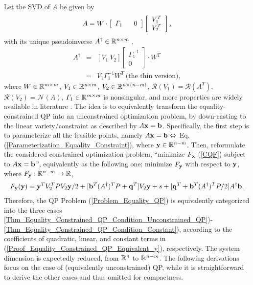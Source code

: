 \documentclass{imaman}
\newcommand{\beq}{\begin{eqnarray}}
\newcommand{\eeq}{\end{eqnarray}}
\newcommand{\bfb}{{\bf b}}
\newcommand{\bfx}{{\bf x}}
\newcommand{\bfq}{{\bf q}}
\newcommand{\bfy}{{\bf y}}
\newcommand{\real}{\mathbb{R}}
\newcommand{\calN}{{\mathcal N}}
\newcommand{\calR}{{\mathcal R}}
\newcommand{\itm}{{\it m}}
\newcommand{\itn}{{\it n}}
\numberwithin{equation}{section}
\begin{document}
Let the SVD of $A$ be given by
\beq
A=W\cdot\left[ \begin{array}{cc} \Gamma_1~~ & 0 \end{array}\right]\left[ \def\arraystretch{1}\begin{array}{c} V_1^T\\V_2^T\end{array}\right],\nonumber
\eeq
with its unique pseudoinverse $A^\dagger\in\real^{\itn\times\itm}$ \citep{GoVa:13},
\newpage\noindent\beq
A^\dagger&=&[V_1~V_2]\left[ \begin{array}{c} \Gamma_1^{-1}\\ 0 \end{array}\right]\cdot W^T\nonumber\\
&=&V_1\Gamma_1^{-1}W^T~\mbox{(the thin version)},
\label{App_Proof_Equality_Constrained_QP_A_dagger}
\eeq
where $W\in\real^{\itm\times\itm}$, $V_1\in\real^{\itn\times\itm}$, $V_2\in\real^{\itn\times(\itn-\itm)}$, $\calR(V_1)=\calR(A^T)$, $\calR(V_2)=\calN(A)$, $\Gamma_1\in\real^{\itm\times\itm}$ is nonsingular, and more properties are widely available in literature \citep{GoVa:13}. The idea is to equivalently transform the equality-constrained QP into an unconstrained optimization problem, by down-casting to the linear variety/constraint as described by $A\bfx=\bfb$. Specifically, the first step is to parameterize all the feasible points, namely $A\bfx=\bfb\Leftrightarrow$ Eq. (\ref{Parameterization_Equality_Constraint}), where $\bfy\in\real^{\itn-\itm}$. Then, reformulate the considered constrained optimization problem, ``minimize $F_\bfx$ (\ref{CQF}) subject to $A\bfx=\bfb$'', equivalently as the following one: minimize $F_\bfy$ with respect to $\bfy$, where $F_\bfy:\real^{\itn-\itm}\rightarrow\real$,
\beq
F_\bfy(\bfy)=\bfy^TV_2^TPV_2\bfy/2+[\bfb^T(A^\dagger)^TP+\bfq^T]V_2\bfy+s+[\bfq^T+\bfb^T(A^\dagger)^TP/2]A^\dagger\bfb.
\label{Proof_Equality_Constrained_QP_Equivalent_y}
\eeq
Therefore, the QP Problem (\ref{Problem_Equality_QP}) is equivalently categorized into the three cases \ref{Thm_Equality_Constrained_QP_Condition_Unconstrained_QP})-\ref{Thm_Equality_Constrained_QP_Condition_Constant}), according to the coefficients of quadratic, linear, and constant terms in (\ref{Proof_Equality_Constrained_QP_Equivalent_y}), respectively. The system dimension is expectedly reduced, from $\real^\itn$ to $\real^{\itn-\itm}$. The following derivations focus on the case of (equivalently unconstrained) QP, while it is straightforward to derive the other cases and thus omitted for compactness.
\end{document}

